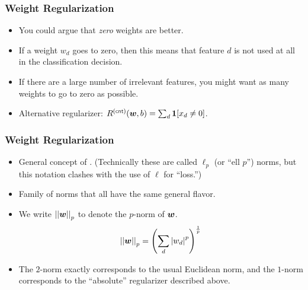 \documentclass[trans]{beamer}
\begin{document}
\begin{frame}
  \frametitle{Weight Regularization}
\begin{itemize}
\item
You could argue that
\emph{zero} weights are better.  
\item If a weight $w_d$ goes to zero, then
this means that feature $d$ is not used at all in the classification
decision.
\item   If there are a large number of irrelevant features, you
might want as many weights to go to zero as possible.  
\item Alternative regularizer: $R\xth{cnt}(\vw,b) = \sum_d \Ind[x_d \neq
0]$.
\end{itemize}
\end{frame}

\begin{frame}
  \frametitle{Weight Regularization}
\begin{itemize}
\item
General concept of
.  (Technically these are called $\ell_p$ (or ``ell
$p$'') norms, but this notation clashes with the use of $\ell$ for
``loss.'') 
\item Family of norms that all have the same general
flavor. 
\item We write $\left\vert\left\vert {\boldsymbol{w}} \right\vert\right\vert_p$ to denote the $p$-norm of ${\boldsymbol{w}}$.
%
\begin{equation} \label{eq:loss:l}
  \left\vert\left\vert {\boldsymbol{w}} \right\vert\right\vert_p = \left( \sum_d \left\vert w_d \right\vert^p \right)^{\frac 1 p}
\end{equation}
%
\item The $2$-norm exactly corresponds to the usual
Euclidean norm, and  the $1$-norm corresponds to the ``absolute''
regularizer described above.
\end{itemize}
\end{frame}
\end{document}
